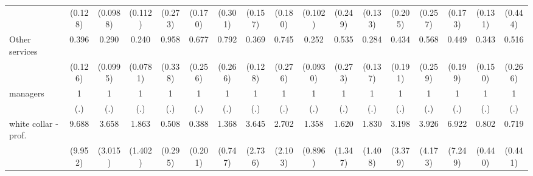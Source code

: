 {\begin{tabular}{l*{16}{c}}
                    &     (0.128)         &    (0.0988)         &     (0.112)         &     (0.273)         &     (0.170)         &     (0.301)         &     (0.157)         &     (0.180)         &     (0.102)         &     (0.249)         &     (0.133)         &     (0.205)         &     (0.257)         &     (0.173)         &     (0.131)         &     (0.444)         \\
[1em]
Other services      &       0.396\sym{**} &       0.290\sym{***}&       0.240\sym{***}&       0.958         &       0.677         &       0.792         &       0.369\sym{**} &       0.745         &       0.252\sym{***}&       0.535         &       0.284\sym{**} &       0.434         &       0.568         &       0.449         &       0.343\sym{*}  &       0.516         \\
                    &     (0.126)         &    (0.0995)         &    (0.0781)         &     (0.338)         &     (0.256)         &     (0.266)         &     (0.128)         &     (0.276)         &    (0.0930)         &     (0.273)         &     (0.137)         &     (0.191)         &     (0.259)         &     (0.199)         &     (0.150)         &     (0.266)         \\
[1em]
managers            &           1         &           1         &           1         &           1         &           1         &           1         &           1         &           1         &           1         &           1         &           1         &           1         &           1         &           1         &           1         &           1         \\
                    &         (.)         &         (.)         &         (.)         &         (.)         &         (.)         &         (.)         &         (.)         &         (.)         &         (.)         &         (.)         &         (.)         &         (.)         &         (.)         &         (.)         &         (.)         &         (.)         \\
[1em]
white collar - prof.&       9.688\sym{*}  &       3.658         &       1.863         &       0.508         &       0.388         &       1.368         &       3.645         &       2.702         &       1.358         &       1.620         &       1.830         &       3.198         &       3.926         &       6.922         &       0.802         &       0.719         \\
                    &     (9.952)         &     (3.015)         &     (1.402)         &     (0.295)         &     (0.201)         &     (0.747)         &     (2.736)         &     (2.103)         &     (0.896)         &     (1.347)         &     (1.408)         &     (3.379)         &     (4.173)         &     (7.249)         &     (0.440)         &     (0.441)         \\

\end{tabular}}
